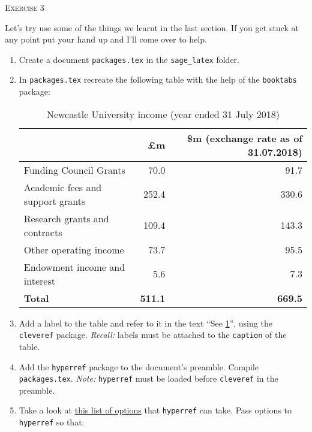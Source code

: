 \documentclass{article}
\begin{document}
\begin{center}
  \Large\color{black!80}\textsc{Exercise 3}
\end{center}

Let's try use some of the things we learnt in the last section. If you
get stuck at any point put your hand up and I'll come over to help.

\begin{enumerate}[label=\color{purple}\theenumi.]

  \item Create a document \texttt{packages.tex} in the \texttt{sage\_latex}
    folder.

  \item In \texttt{packages.tex} recreate the following table with the help of
    the \texttt{booktabs} package:

    \begin{table}[h]
      \begin{tabular}{@{}lrr@{}}
        \toprule
        & \textbf{£m} & \textbf{\$m (exchange rate as of 31.07.2018)} \\\midrule
        Funding Council Grants           & 70.0  & 91.7  \\
        Academic fees and support grants & 252.4 & 330.6 \\
        Research grants and contracts    & 109.4 & 143.3 \\
        Other operating income           & 73.7  & 95.5  \\
        Endowment income and interest    & 5.6   & 7.3   \\\midrule
        \textbf{Total} & \textbf{511.1} & \textbf{669.5} \\\bottomrule
      \end{tabular}
      \caption{Newcastle University income (year ended 31 July 2018)}
      \label{tab:newcy}
    \end{table}

  \item Add a label to the table and refer to it in the text
    ``See \cref{tab:newcy}'', using the \texttt{cleveref} package.
    \textsl{Recall:} labels must be attached to the \texttt{caption} of the
    table.

  \item Add the \texttt{hyperref} package to the document's preamble.
    Compile \texttt{packages.tex}. \textsl{Note:} \texttt{hyperref} must be 
    loaded before \texttt{cleveref} in the preamble. 

  \item Take a look at
    \href{http://mirror.ox.ac.uk/sites/ctan.org/macros/latex/contrib/hyperref/doc/manual.pdf#page=10}%
    {this list of options} that \texttt{hyperref} can take. Pass options to 
    \texttt{hyperref} so that:


\end{enumerate}
\end{document}
